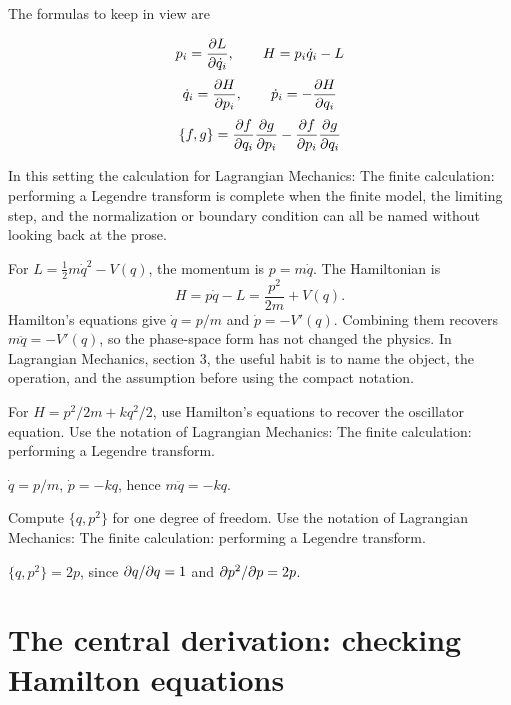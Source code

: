 The formulas to keep in view are

\[
  p_i=\frac{\partial L}{\partial\dot q_i},\qquad H=p_i\dot q_i-L
\]
\[
  \dot q_i=\frac{\partial H}{\partial p_i},\qquad \dot p_i=-\frac{\partial H}{\partial q_i}
\]
\[
  \{f,g\}=\frac{\partial f}{\partial q_i}\frac{\partial g}{\partial p_i}-\frac{\partial f}{\partial p_i}\frac{\partial g}{\partial q_i}
\]

In this setting the calculation for Lagrangian Mechanics: The finite calculation: performing a Legendre transform is complete when the finite model, the limiting step, and the normalization or boundary condition can all be named without looking back at the prose.




\begin{example}
For \(L=\frac12m\dot q^2-V(q)\), the momentum is \(p=m\dot q\).  The Hamiltonian is
\[
  H=p\dot q-L=\frac{p^2}{2m}+V(q).
\]
Hamilton's equations give \(\dot q=p/m\) and \(\dot p=-V'(q)\).  Combining them recovers \(m\ddot q=-V'(q)\), so the phase-space form has not changed the physics.  In Lagrangian Mechanics, section 3, the useful habit is to name the object, the operation, and the assumption before using the compact notation.
\end{example}



\begin{exercise}
For \(H=p^2/2m+kq^2/2\), use Hamilton's equations to recover the oscillator equation.  Use the notation of Lagrangian Mechanics: The finite calculation: performing a Legendre transform.
\begin{answer}
\(\dot q=p/m\), \(\dot p=-kq\), hence \(m\ddot q=-kq\).
\end{answer}
\end{exercise}

\begin{exercise}
Compute \(\{q,p^2\}\) for one degree of freedom.  Use the notation of Lagrangian Mechanics: The finite calculation: performing a Legendre transform.
\begin{answer}
\(\{q,p^2\}=2p\), since \(\partial q/\partial q=1\) and \(\partial p^2/\partial p=2p\).
\end{answer}
\end{exercise}



\section{The central derivation: checking Hamilton equations}

